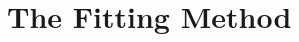 \documentclass[ms.tex]{subfiles}
\begin{document}
\section{The Fitting Method}
\label{sec:fitting}
\end{document}
